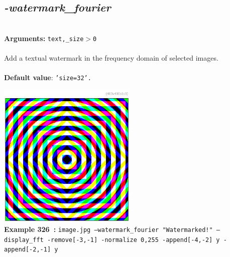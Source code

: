 \documentclass[a4paper,11pt,twoside]{book}
\begin{document}
\subsection{\emph{-watermark\_fourier} }\vspace*{-0.5em}
~\\\textbf{Arguments: } 
{\small \texttt{text,\_size$>$0}}\\~\\
Add a textual watermark in the frequency domain of selected images.
~\\~\\\textbf{Default value}: {\small \texttt{'size=32'.}}
\begin{center}\includegraphics[keepaspectratio=true,height=7cm,width=\textwidth]{img/gmic_def326.jpg}\\
{\footnotesize \textbf{Example 326~:} \texttt{image.jpg --watermark\_fourier "Watermarked!" --display\_fft -remove[-3,-1] -normalize 0,255 -append[-4,-2] y -append[-2,-1] y}}
\end{center}
\end{document}
